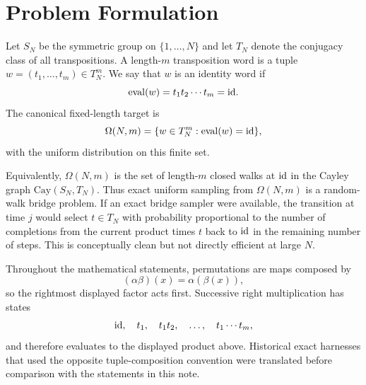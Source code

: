 \section{Problem Formulation}

Let $S_N$ be the symmetric group on $\{1,\ldots,N\}$ and let $T_N$ denote the
conjugacy class of all transpositions.  A length-$m$ transposition word is a
tuple $w=(t_1,\ldots,t_m)\in T_N^m$.  We say that $w$ is an identity word if
\[
  \mathrm{eval}(w) = t_1t_2\cdots t_m = \mathrm{id}.
\]
The canonical fixed-length target is
\[
  \Omega(N,m)
  =
  \{w\in T_N^m : \mathrm{eval}(w)=\mathrm{id}\},
\]
with the uniform distribution on this finite set.

Equivalently, $\Omega(N,m)$ is the set of length-$m$ closed walks at $\mathrm{id}$ in
the Cayley graph $\mathrm{Cay}(S_N,T_N)$.  Thus exact uniform sampling from
$\Omega(N,m)$ is a random-walk bridge problem.  If an exact bridge sampler were
available, the transition at time $j$ would select $t\in T_N$ with probability
proportional to the number of completions from the current product times $t$
back to $\mathrm{id}$ in the remaining number of steps.  This is conceptually clean but
not directly efficient at large $N$.

Throughout the mathematical statements, permutations are maps composed by
\[
  (\alpha\beta)(x)=\alpha(\beta(x)),
\]
so the rightmost displayed factor acts first.  Successive right multiplication
has states
\[
  \mathrm{id},\quad t_1,\quad t_1t_2,\quad\ldots,\quad t_1\cdots t_m,
\]
and therefore evaluates to the displayed product above.  Historical exact
harnesses that used the opposite tuple-composition convention were translated
before comparison with the statements in this note.
